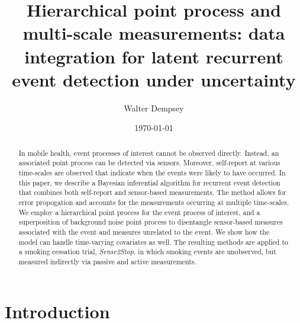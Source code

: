 \documentclass[11pt]{amsart}
\begin{document}
\title[Hierarchical point processes and multi-scale measurements:
 inference for latent event process from multiple sources of
 information]{Hierarchical point process and multi-scale
   measurements: data integration for latent recurrent event
   detection under uncertainty}
\author{Walter Dempsey}
\address {Department of Statistics,
  Harvard University, One Oxford Street
   Cambridge, MA  02138, USA}

\date{\today}

\begin{abstract}
In mobile health, event processes of interest cannot be observed
directly. Instead, an associated point process can be detected via
sensors. Moreover, self-report at various time-scales are observed
that indicate when the events were likely to have occurred.
In this paper, we describe a Bayesian inferential algorithm for
recurrent event detection that combines both self-report and
sensor-based measurements.  The method allows for error propogation
and accounts for the measurements occurring at multiple
time-scales. We employ a hierarchical point process for the event
process of interest, and a superposition of background noise point
process to disentangle sensor-based measures associated with the event
and measures unrelated to the event.  We show how the model can handle
time-varying covariates as well. The resulting methods are applied to
a smoking cessation trial, \emph{Sense2Stop}, in which smoking events
are unobserved, but measured indirectly via passive and active
measurements.
\end{abstract}



\maketitle

\section{Introduction}
\label{section:introduction}
\end{document}
